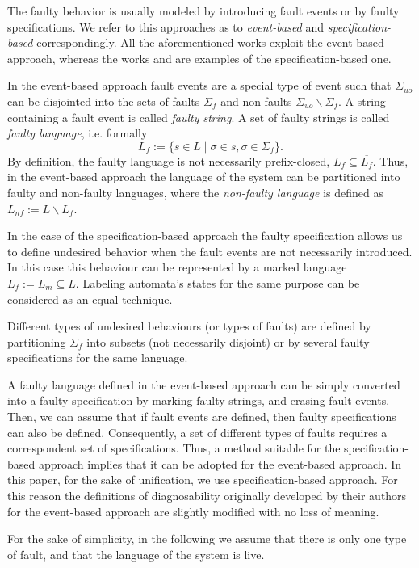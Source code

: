 The faulty behavior is usually modeled by introducing fault events or by faulty
specifications. We refer to this approaches as to \emph{event-based} and
\emph{specification-based} correspondingly. All the aforementioned works exploit
the event-based approach, whereas the works \cite{zhou_decentralized_2008} and
\cite{sartini_methodology_2010} are examples of the specification-based one.

In the event-based approach fault events are a special type of event such that
$\Sigma_{uo}$ can be disjointed into the sets of faults $\Sigma_f$ and
non-faults $\Sigma_{uo}\backslash \Sigma_f$. A string containing a fault event
is called \emph{faulty string}. A set of faulty strings is called \emph{faulty
language}, i.e. formally 
$$L_f := \{ s \in L \mid \sigma \in s, \sigma \in \Sigma_f\}.$$ 
By definition, the faulty language is not necessarily prefix-closed,
$L_f \subseteq \overline{L_f}$. Thus, in the event-based approach the language
of the system can be partitioned into faulty and non-faulty languages, where the
\emph{non-faulty language} is defined as $L_{nf} := L \backslash L_f$.

In the case of the specification-based approach the faulty specification allows
us to define undesired behavior when the fault events are not necessarily
introduced. In this case this behaviour can be represented by a marked
language $L_f := L_m \subseteq L$. Labeling automata's states for the same
purpose can be considered as an equal technique.

Different types of undesired behaviours (or types of faults) are defined by
partitioning $\Sigma_f$ into subsets (not necessarily disjoint) or by several
faulty specifications for the same language. 

A faulty language defined in the event-based approach can be simply converted
into a faulty specification by marking faulty strings, and erasing fault events.
Then, we can assume that if fault events are defined, then faulty specifications
can also be defined. Consequently, a set of different types of faults requires a
correspondent set of specifications.
Thus, a method suitable for the specification-based approach implies that it can
be adopted for the event-based approach. In this paper, for the sake of
unification, we use specification-based approach. For this reason the
definitions of diagnosability originally developed by their authors for the
event-based approach are slightly modified with no loss of meaning.

For the sake of simplicity, in the following we assume that there is only one
type of fault, and that the language of the system is live.

